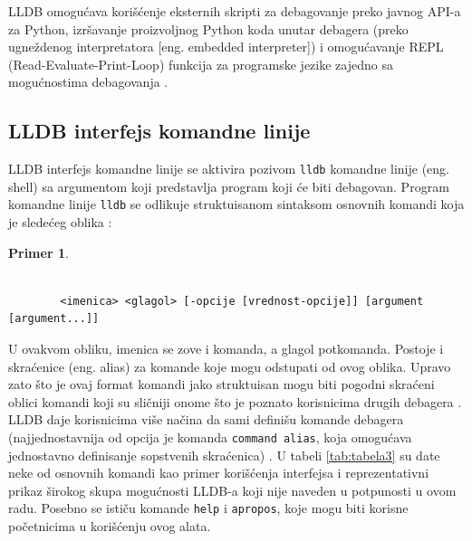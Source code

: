 \documentclass[a4paper]{article}
\newtheorem{primer}{Primer}[section]
\begin{document}
LLDB omogućava korišćenje eksternih skripti za debagovanje preko javnog API-a za Python, izršavanje proizvoljnog Python koda unutar debagera \cite{lldb_python} (preko ugneždenog interpretatora [eng. embedded interpreter]) i omogućavanje REPL (Read-Evaluate-Print-Loop) funkcija za programske jezike zajedno sa mogućnostima debagovanja \cite{swift_lldb_repl}.

\subsection{LLDB interfejs komandne linije}
LLDB interfejs komandne linije se aktivira pozivom \verb|lldb| komandne linije (eng. shell) sa argumentom koji predstavlja program koji će biti debagovan. Program komandne linije \verb|lldb| se odlikuje struktuisanom sintaksom osnovnih komandi koja je sledećeg oblika \cite{lldb_tutorial}:
\begin{primer}
	\begin{footnotesize}
		\begin{verbatim}
		
		<imenica> <glagol> [-opcije [vrednost-opcije]] [argument [argument...]]
		\end{verbatim}
	\end{footnotesize}
\end{primer}
U ovakvom obliku, imenica se zove i komanda, a glagol potkomanda. Postoje i skraćenice (eng. alias) za komande koje mogu odstupati od ovog oblika. Upravo zato što je ovaj format komandi jako struktuisan mogu biti pogodni skraćeni oblici komandi koji su sličniji onome što je poznato korisnicima drugih debagera \cite{apple_lldb_comms}. LLDB daje korisnicima više načina da sami definišu komande debagera (najjednostavnija od opcija je komanda \verb|command alias|, koja omogućava jednostavno definisanje sopstvenih skraćenica) \cite{book}. U tabeli \ref{tab:tabela3} su date neke od osnovnih komandi kao primer korišćenja interfejsa i reprezentativni prikaz širokog skupa mogućnosti LLDB-a koji nije naveden u potpunosti u ovom radu. Posebno se ističu komande \verb|help| i \verb|apropos|, koje mogu biti korisne početnicima u korišćenju ovog alata.
\end{document}
